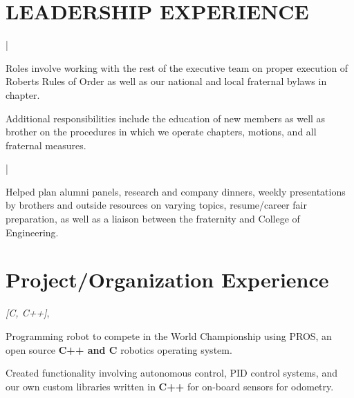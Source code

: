 \documentclass[letterpaper]{deedy-resume}
\begin{document}
\begin{minipage}[t]{0.69\textwidth}
\sectionspace

\section{LEADERSHIP EXPERIENCE}

 |

\begin{tightitemize}
\item Roles involve working with the rest of the executive team on proper execution of Roberts Rules of Order as well as our national and local fraternal bylaws in chapter.
\item Additional responsibilities include the education of new members as well as brother on the procedures in which we operate chapters, motions, and all fraternal measures.
\end{tightitemize}

\sectionspace

 |

\begin{tightitemize}
\item Helped plan alumni panels, research and company dinners, weekly presentations by brothers and outside resources on varying topics, resume/career fair preparation, as well as a liaison between the fraternity and College of Engineering.
\end{tightitemize}


\sectionspace 

\section{Project/Organization Experience}

 \emph{[C, C++]}, \\
\begin{tightitemize}
\item Programming robot to compete in the World Championship using PROS, an open source \textbf{C++ and C} robotics operating system. 
\item Created functionality involving autonomous control, PID control systems, and our own custom libraries written in \textbf{C++} for on-board sensors for odometry.
\end{tightitemize}
\sectionspace 


\end{minipage}
\end{document}
